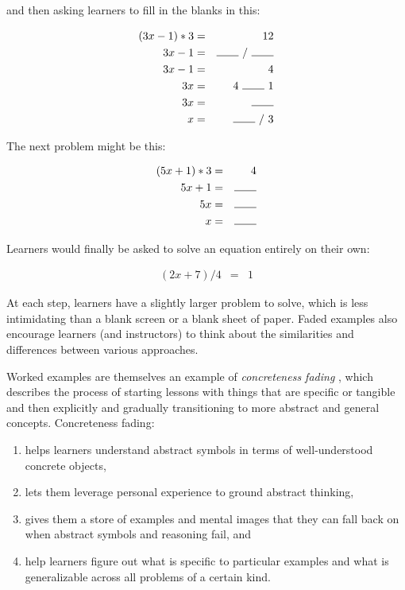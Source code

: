 \documentclass[10pt,letterpaper]{article}
\begin{document}
and then asking learners to fill in the blanks in this:

\begin{eqnarray*}
(3x - 1) * 3 & = & 12 \\
3x - 1 & = & \rule{2em}{0.15mm}~/~\rule{2em}{0.15mm} \\
3x - 1 & = & 4 \\
3x & = & 4~\rule{2em}{0.15mm}~1 \\
3x & = & \rule{2em}{0.15mm} \\
x & = & \rule{2em}{0.15mm}~/~3
\end{eqnarray*}

The next problem might be this:

\begin{eqnarray*}
(5x + 1) * 3 & = & 4 \\
5x + 1 & = & \rule{2em}{0.15mm} \\
5x & = & \rule{2em}{0.15mm} \\
x & = & \rule{2em}{0.15mm} \\
\end{eqnarray*}

Learners would finally be asked to solve an equation entirely on their own:

\begin{eqnarray*}
(2x + 7) / 4 & = & 1
\end{eqnarray*}

At each step, learners have a slightly larger problem to solve, which is less
intimidating than a blank screen or a blank sheet of paper.  Faded examples also
encourage learners (and instructors) to think about the similarities and
differences between various approaches.

Worked examples are themselves an example of \emph{concreteness fading}
\cite{Gold2005,Fyfe2014}, which describes the process of starting lessons with
things that are specific or tangible and then explicitly and gradually
transitioning to more abstract and general concepts.  Concreteness fading:

\begin{enumerate}

\item helps learners understand abstract symbols in terms of well-understood
  concrete objects,

\item lets them leverage personal experience to ground abstract thinking,

\item gives them a store of examples and mental images that they can fall back
  on when abstract symbols and reasoning fail, and

\item help learners figure out what is specific to particular examples and what
  is generalizable across all problems of a certain kind.

\end{enumerate}
\end{document}
